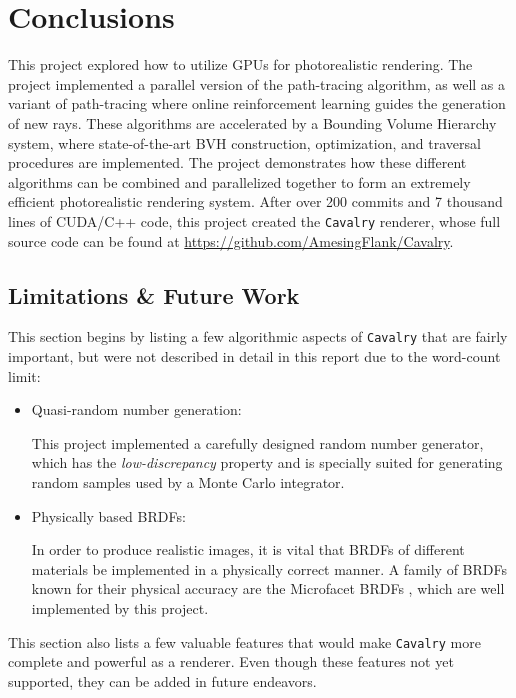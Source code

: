 \chapter{Conclusions}

This project explored how to utilize GPUs for photorealistic rendering. The project implemented a parallel version of the path-tracing algorithm, as well as a variant of path-tracing where online reinforcement learning guides the generation of new rays. These algorithms are accelerated by a Bounding Volume Hierarchy system, where state-of-the-art BVH construction, optimization, and traversal procedures are implemented. The project demonstrates how these different algorithms can be combined and parallelized together to form an extremely efficient photorealistic rendering system. After over 200 commits and 7 thousand lines of CUDA/C++ code, this project created the \texttt{Cavalry} renderer, whose full source code can be found at \url{https://github.com/AmesingFlank/Cavalry}.

\section{Limitations \& Future Work}
This section begins by listing a few algorithmic aspects of \texttt{Cavalry} that are fairly important, but were not described in detail in this report due to the word-count limit:
\begin{itemize}
    \item Quasi-random number generation:
    
    This project implemented a carefully designed random number generator, which has the \textit{low-discrepancy} property and is specially suited for generating random samples used by a Monte Carlo integrator. 

    \item Physically based BRDFs:
    
    In order to produce realistic images, it is vital that BRDFs of different materials be implemented in a physically correct manner. A family of BRDFs known for their physical accuracy are the Microfacet BRDFs \cite{cook1982reflectance}, which are well implemented by this project. 

\end{itemize}

\label{section limitations}
This section also lists a few valuable features that would make \texttt{Cavalry} more complete and powerful as a renderer. Even though these features not yet supported, they can be added in future endeavors.

